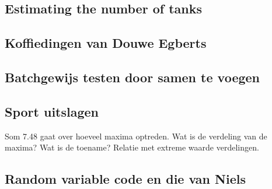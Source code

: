 \documentclass[a4paper]{article}
\theoremstyle{definition}
\newcommand{\1}[1]{\,I_{#1}} %
\begin{document}
\subsection{Estimating the number of tanks}
\label{sec:org0700c8f}


\subsection{Koffiedingen van Douwe Egberts}
\label{sec:orgbe91c90}

\subsection{Batchgewijs testen door samen te voegen}
\label{sec:org7f21ad2}



\subsection{Sport uitslagen}
\label{sec:org9a46c5b}

Som 7.48 gaat over hoeveel maxima optreden. Wat is de verdeling van de maxima? Wat is de toename? Relatie met extreme waarde verdelingen. 

\subsection{Random variable code en die van Niels}
\label{sec:org57ced54}
\end{document}
